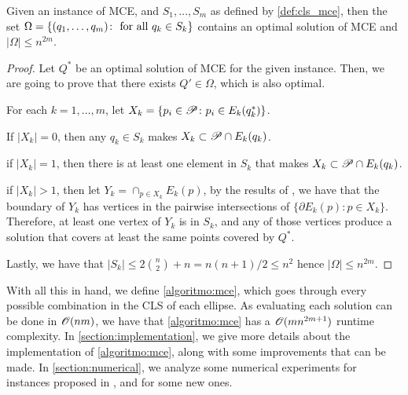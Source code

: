 \begin{thm}
	Given an instance of MCE, and $S_1, \dots, S_m$ as defined by \autoref{def:cls_mce}, then the set $\Omega = \{(q_1, \dots, q_m) \colon \textnormal{ for all }q_k \in S_k \}$ contains an optimal solution of MCE and $|\Omega| \le n^{2m}$. 
\end{thm}
\begin{proof}
	Let $Q^*$ be an optimal solution of MCE for the given instance. Then, we are going to prove that there exists $Q' \in \Omega$, which is also optimal.
	
	For each $k=1, \dots, m$, let $X_k = \{p_i \in \mathscr{P}\colon p_i \in E_k(q_k^*)\}$.
	
	If $|X_k| = 0$, then any $q_k \in S_k$ makes $X_k \subset \mathscr{P} \cap E_k(q_k)$.
	
	if $|X_k| = 1$, then there is at least one element in $S_k$ that makes $X_k \subset \mathscr{P} \cap E_k(q_k)$.
	
	if $|X_k| > 1$, then let $Y_k = \cap_{p \in X_k}E_k(p)$, by the results of \cite{bi}, we have that the boundary of $Y_k$ has vertices in the pairwise intersections of $\{\partial E_k(p) \colon p \in X_k\}$. Therefore, at least one vertex of $Y_k$ is in $S_k$, and any of those vertices produce a solution that covers at least the same points covered by $Q^*$.
	
	Lastly, we have that $|S_k| \le 2\binom{n}{2} + n = n(n+1)/2 \le n^2$ hence $|\Omega| \le n^{2m}$.
\end{proof}

With all this in hand, we define \autoref{algoritmo:mce}, which goes through every possible combination in the CLS of each ellipse. As evaluating each solution can be done in $\mathscr{O}(nm)$, we have that \autoref{algoritmo:mce} has a $\mathscr{O}(mn^{2m+1})$ runtime complexity. In \autoref{section:implementation}, we give more details about the implementation of \autoref{algoritmo:mce}, along with some improvements that can be made. In \autoref{section:numerical}, we analyze some numerical experiments for instances proposed in \cite{canbolat, andreta}, and for some new ones.

